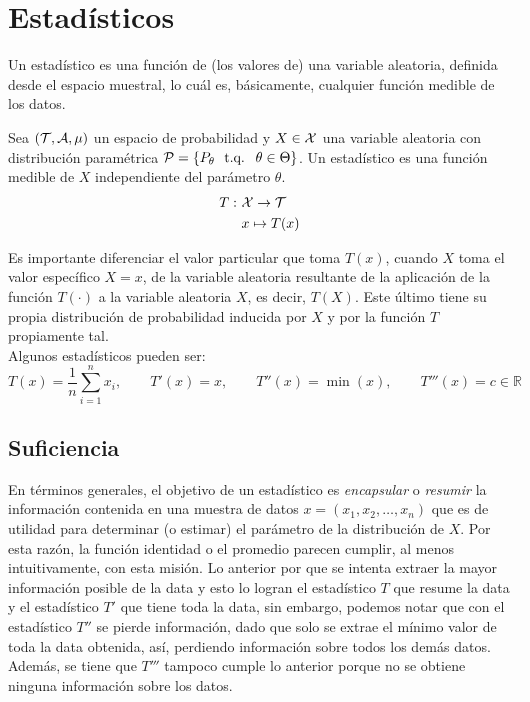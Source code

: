 \chapter{Estadísticos}

Un estadístico es una función de (los valores de) una variable aleatoria, definida desde el espacio muestral, lo cuál es, básicamente, cualquier función medible de los datos.\\ 

\begin{definition}[Estadístico]
\label{def:estadístico}
Sea $({\mathcal T},{\mathcal A},\mu)$ un espacio de probabilidad y $X\in{\mathcal X}$ una variable aleatoria con distribución paramétrica $\cP = \{P_\theta\ \tq\ \theta\in\Theta\}$. Un estadístico es una función medible de $X$ independiente del parámetro $\theta$.
\begin{align}
\nonumber
	T:\ &{\mathcal X} \rightarrow {\mathcal T}\\
\nonumber
	&x\mapsto T(x)
\end{align} 

\end{definition}


Es importante diferenciar el valor particular que toma $T(x)$, cuando $X$ toma el valor específico $X=x$, de la variable aleatoria resultante de la aplicación de la función $T(\cdot)$ a la variable aleatoria $X$, es decir, $T(X)$. Este último tiene su propia distribución de probabilidad inducida por $X$ y por la función $T$ propiamente tal.\\ 

Algunos estadísticos pueden ser: 
\begin{equation}
\nonumber
	T(x) = \frac{1}{n}\sum_{i=1}^nx_i,\qquad T'(x) = x, \qquad T''(x) = \min(x), \qquad T'''(x) = c\in \mathbb{R}
\end{equation}

\section{Suficiencia}
En términos generales, el objetivo de un estadístico es \textit{encapsular} o \textit{resumir} la información contenida en una muestra de datos $x = (x_1,x_2,\ldots,x_n)$ que es de utilidad para determinar (o estimar) el parámetro de la distribución de $X$. Por esta razón, la función identidad o el promedio parecen cumplir, al menos intuitivamente, con esta misión. Lo anterior por que se intenta extraer la mayor información posible de la data y esto lo logran el estadístico $T$ que resume la data y el estadístico $T'$ que tiene toda la data, sin embargo, podemos notar que con el estadístico $T''$ se pierde información, dado que solo se extrae el mínimo valor de toda la data obtenida, así, perdiendo información sobre todos los demás datos. Además, se tiene que $T'''$ tampoco cumple lo anterior porque no se obtiene ninguna información sobre los datos.\\

